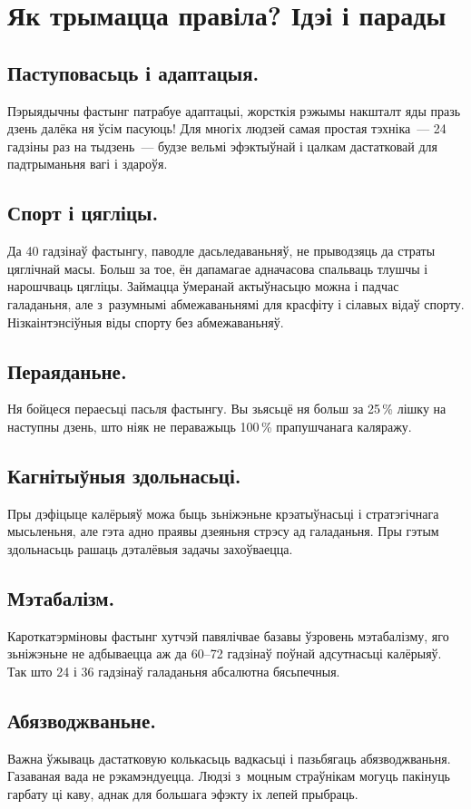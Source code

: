 \section{Як трымацца правіла? Ідэі і парады}

\subsection{Паступовасьць і адаптацыя.}
Пэрыядычны фастынг патрабуе адаптацыі, жорсткія рэжымы накшталт яды празь дзень далёка ня ўсім пасуюць! Для многіх людзей самая простая тэхніка~--- 24 гадзіны раз на тыдзень~--- будзе вельмі эфэктыўнай і цалкам дастатковай для падтрыманьня вагі і здароўя.

\subsection{Спорт і цягліцы.}
Да 40 гадзінаў фастынгу, паводле дасьледаваньняў, не прыводзяць да страты цяглічнай масы. Больш за тое, ён дапамагае адначасова спальваць тлушчы і нарошчваць цягліцы. Займацца ўмеранай актыўнасьцю можна і падчас галаданьня, але з~разумнымі абмежаваньнямі для красфіту і сілавых відаў спорту. Нізкаінтэнсіўныя віды спорту без абмежаваньняў.

\subsection{Пераяданьне.}
Ня бойцеся пераесьці пасьля фастынгу. Вы зьясьцё ня больш за 25\,\% лішку на наступны дзень, што ніяк не пераважыць 100\,\% прапушчанага каляражу.

\subsection{Кагнітыўныя здольнасьці.}
Пры дэфіцыце калёрыяў можа быць зьніжэньне крэатыўнасьці і стратэгічнага мысьленьня, але гэта адно праявы дзеяньня стрэсу ад галаданьня. Пры гэтым здольнасьць рашаць дэталёвыя задачы захоўваецца.

\subsection{Мэтабалізм.}
Кароткатэрміновы фастынг хутчэй павялічвае базавы ўзровень мэтабалізму, яго зьніжэньне не адбываецца аж да 60--72 гадзінаў поўнай адсутнасьці калёрыяў. Так што 24 і 36 гадзінаў галаданьня абсалютна бясьпечныя.

\subsection{Абязводжваньне.}
Важна ўжываць дастатковую колькасьць вадкасьці і пазьбягаць абязводжваньня. Газаваная вада не рэкамэндуецца. Людзі з~моцным страўнікам могуць пакінуць гарбату ці каву, аднак для большага эфэкту іх лепей прыбраць.

